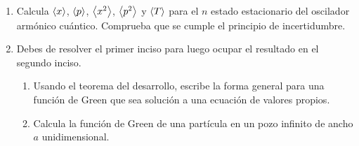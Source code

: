 \begin{enumerate}
\item Calcula $\expval{x}$, $\expval{p}$, $\expval{x^{2}}$, $\expval{p^{2}}$ y $\expval{T}$ para el $n$ estado estacionario del oscilador armónico cuántico. Comprueba que se cumple el principio de incertidumbre.
\item Debes de resolver el primer inciso para luego ocupar el resultado en el segundo inciso.
\begin{enumerate}
\item Usando el teorema del desarrollo, escribe la forma general para una función de Green que sea solución a una ecuación de valores propios.
\item Calcula la función de Green de una partícula en un pozo infinito de ancho $a$ unidimensional.
\end{enumerate}
\end{enumerate}
